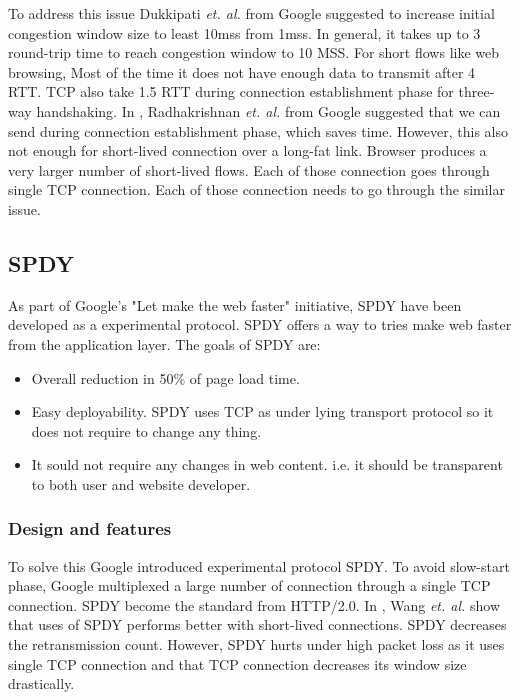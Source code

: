 To address this issue Dukkipati \textit{et. al.} from Google suggested to increase initial congestion window size to least 10mss\cite{google-long-initcwnd} from 1mss. In general, it takes up to 3 round-trip time to reach congestion window to 10 MSS. For short flows like web browsing, Most of the time it does not have enough data to transmit after 4 RTT. TCP also take 1.5 RTT during connection establishment phase for three-way handshaking. In \cite{google-fast-open}, Radhakrishnan \textit{et. al.} from Google suggested that we can send during connection establishment phase, which saves time. However, this also not enough for short-lived connection over a long-fat link. Browser produces a very larger number of short-lived flows. Each of those connection goes through single TCP connection. Each of those connection needs to go through the similar issue. 

\subsection{SPDY}
As part of Google's "Let make the web faster" initiative, SPDY have been developed as a experimental protocol\cite{spdy}. SPDY offers a way to tries make web faster from the application layer. The goals of SPDY are:
\begin{itemize}
    \item Overall reduction in 50\% of page load time.
    \item Easy deployability. SPDY uses TCP as under lying transport protocol so it does not require to change any thing.
    \item It sould not require any changes in web content. i.e. it should be transparent to both user and website developer.
\end{itemize}

\subsubsection{Design and features}

To solve this Google introduced experimental protocol SPDY\cite{spdy}. To avoid slow-start phase, Google multiplexed a large number of connection through a single TCP connection. SPDY become the standard from HTTP/2.0. In \cite{howspeedis}, Wang \textit{et. al.} show that uses of SPDY performs better with short-lived connections. SPDY decreases the retransmission count. However, SPDY hurts under high packet loss as it uses single TCP connection and that TCP connection decreases its window size drastically. 

